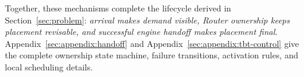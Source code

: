 Together, these mechanisms complete the lifecycle derived in
Section~\ref{sec:problem}:
\emph{arrival makes demand visible, Router ownership keeps placement revisable,
and successful engine handoff makes placement final}.
Appendix~\ref{sec:appendix:handoff} and
Appendix~\ref{sec:appendix:tbt-control} give the complete ownership state
machine, failure transitions, activation rules, and local scheduling details.
